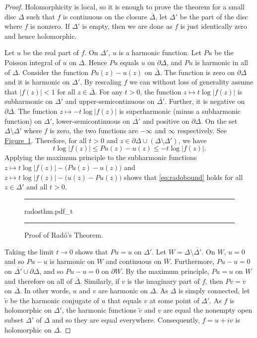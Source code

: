 \documentclass[12pt,openany]{book}
\newcommand{\abs}[1]{\left\lvert {#1} \right\rvert}
\theoremstyle{plain}
\theoremstyle{remark}
\theoremstyle{definition}
\newenvironment{myfig}{%
\begin{figure}[h!t]
\noindent\rule{\textwidth}{0.4pt}\vspace{12pt}\par\centering}%
{\par\noindent\rule{\textwidth}{0.4pt}
\end{figure}}
\theoremstyle{exercise}
\theoremstyle{example}
\newcommand{\figureref}[1]{\hyperref[#1]{Figure~\ref*{#1}}}
\begin{document}
\begin{proof}
Holomorphicity is local, so
it is enough to prove the theorem for a small disc $\Delta$
such that $f$ is continuous
on the closure $\overline{\Delta}$, let $\Delta'$ be the part of the disc
where $f$ is nonzero.  If $\Delta'$ is empty, then we are done as
$f$ is just identically zero and hence holomorphic.

Let $u$ be the real part of $f$.  On $\Delta'$, $u$ is a harmonic function.
Let $Pu$ be the Poisson integral of $u$ on $\Delta$.  Hence $Pu$
equals $u$ on $\partial \Delta$, and $Pu$ is harmonic in all of $\Delta$.
Consider the function
$Pu(z) - u(z)$ on $\overline{\Delta}$.  The function is zero
on $\partial \Delta$ and it is harmonic on $\Delta'$.  By rescaling $f$
we can without loss of generality assume that $\abs{f(z)} < 1$ for all $z
\in \overline{\Delta}$.  For any $t >0$, the function 
$z \mapsto t \log \abs{f(z)}$ is subharmonic on $\Delta'$ and
upper-semicontinuous on $\overline{\Delta'}$.  Further, it is negative
on $\partial \Delta$.  The function $z \mapsto -t \log \abs{f(z)}$ is
superharmonic (minus a subharmonic function) on $\Delta'$,
lower-semicontinuous on $\overline{\Delta'}$ and positive on $\partial
\Delta$.  On the set $\Delta \setminus \Delta'$ where $f$ is zero, the two functions are $-\infty$ and
$\infty$ respectively.
See \figureref{fig:radosthm}.
Therefore, for all $t > 0$ and 
$z \in \partial \Delta \cup (\Delta \setminus \Delta')$,
we have
\begin{equation} \label{eq:radobound}
t \log \abs{f(z)} \leq Pu(z)-u(z) \leq -t \log \abs{f(z)}  .
\end{equation}
Applying the maximum principle to the subharmonic functions
$z \mapsto t \log \abs{f(z)} - \bigl(Pu(z)-u(z)\bigr)$
and
$z \mapsto t \log \abs{f(z)} - \bigl(u(z)-Pu(z)\bigr)$
shows that 
\eqref{eq:radobound} holds for all $z \in \Delta'$ and all $t > 0$.

\begin{myfig}
{radosthm.pdf_t}
\caption{Proof of Rad\'o's Theorem.\label{fig:radosthm}}
\end{myfig}

Taking the limit
$t \to 0$ shows that $Pu = u$ on $\Delta'$.
Let $W = \Delta \setminus \overline{\Delta'}$.
On $W$, $u=0$ and so $Pu-u$ is harmonic on $W$
and continuous on $\overline{W}$.  Furthermore,
$Pu-u=0$ on $\overline{\Delta'} \cup \partial \Delta$,
and so $Pu-u=0$ on $\partial W$.  By the maximum principle, $Pu=u$ on $W$
and therefore on all of $\overline{\Delta}$.
Similarly, if $v$ is the imaginary part of $f$, then $Pv = v$ on
$\overline{\Delta}$.
In other words, $u$ and $v$ are harmonic on $\Delta$.
As $\Delta$ is simply connected,
let $\tilde{v}$ be the harmonic conjugate of $u$ that equals $v$ at
some point of $\Delta'$.  As $f$ is holomorphic on $\Delta'$,
the harmonic functions $\tilde{v}$ and $v$
are equal the nonempty open subset $\Delta'$ of $\Delta$ and so
they are equal everywhere.  Consequently, $f = u +iv$ is holomorphic on
$\Delta$.
\end{proof}
\end{document}

